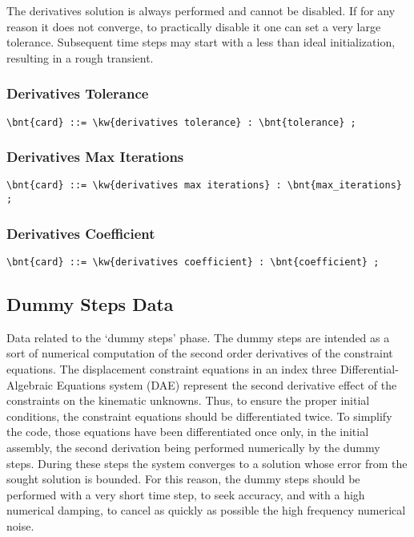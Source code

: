 The derivatives solution is always performed and cannot be disabled.
If for any reason it does not converge, to practically disable it 
one can set a very large tolerance.
Subsequent time steps may start with a less than ideal initialization,
resulting in a rough transient.

\subsubsection{Derivatives Tolerance}
\begin{Verbatim}[commandchars=\\\{\}]
    \bnt{card} ::= \kw{derivatives tolerance} : \bnt{tolerance} ;
\end{Verbatim}

\subsubsection{Derivatives Max Iterations}
\begin{Verbatim}[commandchars=\\\{\}]
    \bnt{card} ::= \kw{derivatives max iterations} : \bnt{max_iterations} ;
\end{Verbatim}

\subsubsection{Derivatives Coefficient}
\begin{Verbatim}[commandchars=\\\{\}]
    \bnt{card} ::= \kw{derivatives coefficient} : \bnt{coefficient} ;
\end{Verbatim}



\subsection{Dummy Steps Data}
Data related to the `dummy steps' phase.
The dummy steps are intended as a sort of numerical computation 
of the second order derivatives of the constraint equations. 
The displacement constraint equations in an index three 
Differential-Algebraic Equations system
(DAE) represent the second derivative effect of the constraints on the
kinematic unknowns. Thus, to ensure the proper initial conditions, the
constraint equations should be differentiated twice. To simplify the code,
those equations have been differentiated once only, in the initial assembly,
the second derivation being performed numerically by the dummy steps.
During these steps the system converges to a solution whose error from
the sought solution is bounded. For this reason, the dummy steps
should be performed with a very short time step, to seek accuracy, and
with a high numerical damping, to cancel as quickly as possible the high
frequency numerical noise.

